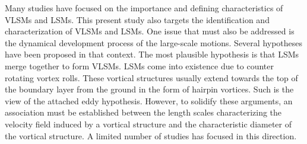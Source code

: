 Many studies have focused on the importance and defining characteristics of VLSMs and LSMs. This present study also targets the identification and characterization of VLSMs and LSMs. One issue that must also be addressed is the dynamical development process of the large-scale motions. Several hypotheses have been proposed in that context. The most plausible hypothesis is that LSMs merge together to form VLSMs. LSMs come into existence due to counter rotating vortex rolls. These vortical structures usually extend towards the top of the boundary layer from the ground in the form of hairpin vortices. Such is the view of the attached eddy hypothesis. However, to solidify these arguments, an association must be established between the length scales characterizing the velocity field induced by a vortical structure and the characteristic diameter of the vortical structure. A  limited number of studies has focused in this direction. 
